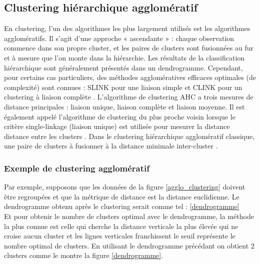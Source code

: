 \subsection{Clustering hiérarchique agglomératif}
En clustering, l'un des algorithmes les plus largement utilisés est les algorithmes agglomératifs. Il s'agit d'une approche « ascendante » : chaque observation commence dans son propre cluster, et les paires de clusters sont fusionnées au fur et à mesure que l'on monte dans la hiérarchie. Les résultats de la classification hiérarchique sont généralement présentés dans un dendrogramme. Cependant, pour certains cas particuliers, des méthodes agglomératives efficaces optimales (de complexité) sont connues : SLINK pour une liaison simple et CLINK pour un clustering à liaison complète \cite{sasirekha2013agglomerative}.
L’algorithme de clustering AHC a trois mesures de distance principales : liaison unique, liaison complète et liaison moyenne. Il est également appelé l’algorithme de clustering du plus proche voisin lorsque le critère single-linkage (liaison unique) est utilisée pour mesurer la distance distance entre les clusters \cite{zhou2016method}.
Dans le clustering hiérarchique agglomératif classique, une paire de clusters à fusionner à la distance minimale inter-cluster \cite{wu2004clustering}.

\subsubsection{Exemple de clustering agglomératif}

Par exemple, supposons que les données de la figure \ref{agglo_clustering} doivent être regroupées et que la métrique de distance est la distance euclidienne.
Le dendrogramme obtenu après le clustering serait comme tel : \ref{dendrogramme} \\
Et pour obtenir le nombre de clusters optimal avec le dendrogramme, la méthode la plus connue est celle qui cherche la distance verticale la plus élevée qui ne croise aucun cluster et les lignes verticales franchissent le seuil représente le nombre optimal de clusters. En utilisant le dendrogramme précédant on obtient 2 clusters comme le montre la figure \ref{dendrogramme}.

